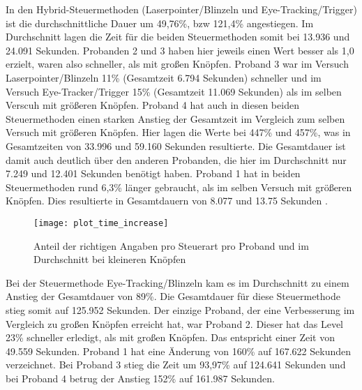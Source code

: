 In den Hybrid-Steuermethoden (Laserpointer/Blinzeln und Eye-Tracking/Trigger) ist die durchschnittliche Dauer um 49,76\%, bzw 121,4\% angestiegen. Im Durchschnitt lagen  die Zeit für die beiden Steuermethoden somit bei 13.936  und 24.091 Sekunden. Probanden 2 und 3 haben hier jeweils einen Wert besser als 1,0 erzielt, waren also schneller,  als mit großen Knöpfen. Proband 3 war im Versuch Laserpointer/Blinzeln 11\% (Gesamtzeit 6.794 Sekunden) schneller und im Versuch Eye-Tracker/Trigger 15\% (Gesamtzeit 11.069 Sekunden) als im selben Verscuh mit größeren Knöpfen. Proband 4 hat auch in diesen beiden Steuermethoden einen starken Anstieg der Gesamtzeit im Vergleich zum selben Versuch mit größeren Knöpfen. Hier lagen die Werte bei 447\% und 457\%, was in Gesamtzeiten von 33.996 und 59.160 Sekunden resultierte. Die Gesamtdauer ist damit auch deutlich über den anderen Probanden, die hier im Durchschnitt nur 7.249 und 12.401 Sekunden benötigt haben. Proband 1 hat in beiden Steuermethoden rund 6,3\% länger gebraucht, als im selben Versuch mit größeren Knöpfen. Dies resultierte in Gesamtdauern von 8.077 und 13.75 Sekunden . 
\begin{figure}[!htbp]
	\centering
	\texttt{[image: plot\_time\_increase]}
	\caption[Anteil der richtigen Angaben pro Steuerart pro Proband und im Durchschnitt bei kleineren Knöpfen]{Anteil der richtigen Angaben pro Steuerart pro Proband und im Durchschnitt bei kleineren Knöpfen}
	\label{fig:timesIncrease}
\end{figure}
Bei der Steuermethode Eye-Tracking/Blinzeln kam es im Durchschnitt zu einem Anstieg der Gesamtdauer von 89\%. Die Gesamtdauer für diese Steuermethode stieg somit auf 125.952 Sekunden. Der einzige Proband, der eine Verbesserung im Vergleich zu großen Knöpfen erreicht hat, war Proband 2. Dieser hat das Level 23\% schneller erledigt, als mit großen Knöpfen. Das entspricht einer Zeit von 49.559 Sekunden. Proband 1 hat eine Änderung von 160\% auf 167.622 Sekunden verzeichnet. Bei Proband 3 stieg die Zeit um 93,97\% auf 124.641 Sekunden und bei Proband 4 betrug der Anstieg 152\% auf 161.987 Sekunden. 

